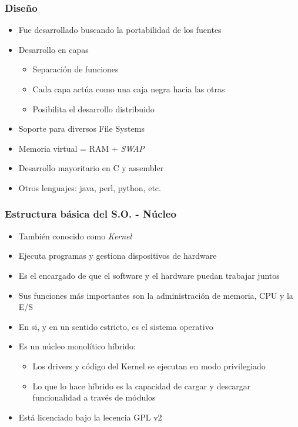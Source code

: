 \begin{frame}
	\frametitle{Diseño}
	\begin{itemize}
		\item Fue desarrollado buscando la portabilidad de los fuentes
		\item Desarrollo en capas
		\begin{itemize}
			\item Separación de funciones
			\item Cada capa actúa como una caja negra hacia las otras
			\item Posibilita el desarrollo distribuido
		\end{itemize}
		\item Soporte para diversos File Systems
		\item Memoria virtual = RAM + \textit{SWAP}
		\item Desarrollo mayoritario en C y assembler
		\item Otros lenguajes: java, perl, python, etc.
	\end{itemize}
\end{frame}

\begin{frame}
	\frametitle{Estructura básica del S.O. - Núcleo}
	\begin{itemize}
		\item También conocido como \textit{Kernel}
		\item Ejecuta programas y gestiona dispositivos de hardware
		\item Es el encargado de que el software y el hardware puedan trabajar juntos
		\item Sus funciones más importantes son la administración de memoria, CPU y la E/S
		\item En si, y en un sentido estricto, es el sistema operativo
		\item Es un núcleo monolítico híbrido:
		\begin{itemize}
			\item Los drivers y código del Kernel se ejecutan en modo privilegiado
			\item Lo que lo hace híbrido es la capacidad de cargar y descargar funcionalidad a través de módulos
		\end{itemize}
		\item Está licenciado bajo la lecencia GPL v2
	\end{itemize}
\end{frame}

